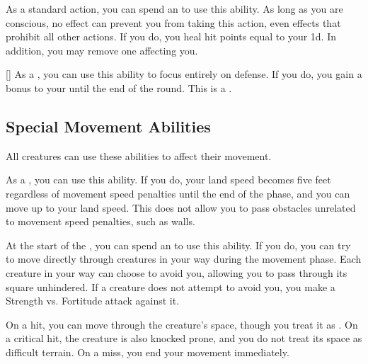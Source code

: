         \begin{ability}{}
            As a standard action, you can spend an  to use this ability.
            As long as you are conscious, no effect can prevent you from taking this action, even effects that prohibit all other actions.
            If you do, you heal hit points equal to your  \minus1d.
            In addition, you may remove one  affecting you.
        \end{ability}

        \begin{ability}{}[]
            As a , you can use this ability to focus entirely on defense.
            If you do, you gain a  bonus to your  until the end of the round.
            This is a .
        \end{ability}

    \subsection{Special Movement Abilities}

        All creatures can use these abilities to affect their movement.

        \begin{ability}{}
            As a , you can use this ability.
            If you do, your land speed becomes five feet regardless of movement speed penalties until the end of the phase, and you can move up to your land speed.
            This does not allow you to pass obstacles unrelated to movement speed penalties, such as walls.
        \end{ability}

        \begin{ability}{}
            At the start of the , you can spend an  to use this ability.
            If you do, you can try to move directly through creatures in your way during the movement phase.
            Each creature in your way can choose to avoid you, allowing you to pass through its square unhindered.
            If a creature does not attempt to avoid you, you make a Strength vs. Fortitude attack against it.

            On a hit, you can move through the creature's space, though you treat it as .
            On a critical hit, the creature is also knocked prone, and you do not treat its space as difficult terrain.
            On a miss, you end your movement immediately.
        \end{ability}

